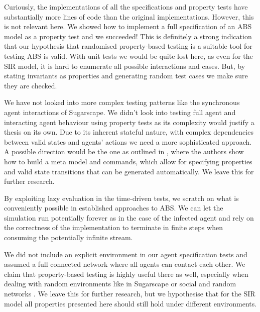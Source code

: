 Curiously, the implementations of all the specifications and property tests have substantially more lines of code than the original implementations. However, this is not relevant here. We showed how to implement a full specification of an ABS model as a property test and we succeeded! This is definitely a strong indication that our hypothesis that randomised property-based testing is a suitable tool for testing ABS is valid. With unit tests we would be quite lost here, as even for the SIR model, it is hard to enumerate all possible interactions and cases. But, by stating invariants as properties and generating random test cases we make sure they are checked.

We have not looked into more complex testing patterns like the synchronous agent interactions of Sugarscape. We didn't look into testing full agent and interacting agent behaviour using property tests as its complexity would justify a thesis on its own. Due to its inherent stateful nature, with complex dependencies between valid states and agents' actions we need a more sophisticated approach. A possible direction would be the one as outlined in \cite{de_vries_quickcheckstatemachine}, where the authors show how to build a meta model and commands, which allow for specifying properties and valid state transitions that can be generated automatically. We leave this for further research.

By exploiting lazy evaluation in the time-driven tests, we scratch on what is conveniently possible in established approaches to ABS. We can let the simulation run potentially forever as in the case of the infected agent and rely on the correctness of the implementation to terminate in finite steps when consuming the potentially infinite stream.

We did not include an explicit environment in our agent specification tests and assumed a full connected network where all agents can contact each other. We claim that property-based testing is highly useful there as well, especially when dealing with random environments like in Sugarscape or social and random networks \cite{easley_networks_2010,jackson_social_2008}. We leave this for further research, but we hypothesise that for the SIR model all properties presented here should still hold under different environments.
